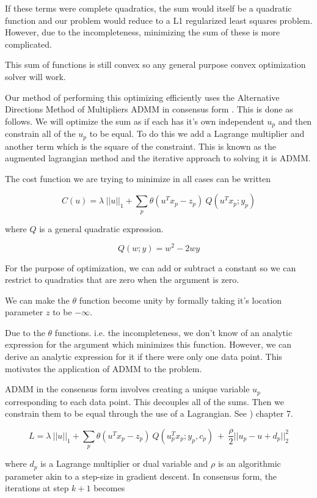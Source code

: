 \documentclass{article}
\begin{document}
If these terms were complete quadratics, the sum would itself be a quadratic
function and our problem would reduce to a L1 regularized least squares problem.
However, due to the incompleteness, minimizing the sum of these is more
complicated.

This sum of functions is still convex so any general purpose convex
optimization solver will work.

Our method of performing this optimizing efficiently uses the Alternative
Directions Method of Multipliers ADMM in consensus form \cite{boyd-admm}.
This is done as follows. We will optimize the sum as if each has it's own
independent $u_p$ and then constrain all of the $u_p$ to be equal. To do this
we add a Lagrange multiplier and another term which is the square of the
constraint. This is known as the augmented lagrangian method and the
iterative approach to solving it is ADMM.

The cost function we are trying to minimize in all cases can be written

\[
C(u) = \lambda ~ ||u||_1 + \sum_p \theta(u^T x_p - z_p) ~ Q(u^T x_p; y_p)
\]

where $Q$ is a general quadratic expression.

\[
Q(w; y) = w^2 - 2 w y
\]

For the purpose of optimization,
we can add or subtract a constant so we can restrict to quadratics that are zero
when the argument is zero.

We can make the $\theta$ function become unity by formally taking it's location parameter
$z$ to be $-\infty$.

Due to the $\theta$ functions. i.e. the incompleteness, we don't know of an analytic
expression for the argument which minimizes this function. However, we can derive an analytic
expression for it if there were only one data point. This motivates the application of ADMM
to the problem.

ADMM in the consensus form involves creating a unique variable $u_p$ corresponding to
each data point. This decouples all of the
sums. Then we constrain them to be equal through the use of a Lagrangian.
See \cite{boyd-admm}) chapter 7.

\[
L = \lambda ~ ||u||_1 + \sum_p \theta(u^T x_p - z_p) ~ Q(u_p^T x_p; y_p, c_p)
 ~ + ~ \frac{\rho}{2} ||u_p - u + d_p||_2^2
\]

where $d_p$ is a Lagrange multiplier or dual variable and $\rho$
is an algorithmic parameter akin to a step-size in gradient descent.
In consensus form, the iterations at step $k+1$ becomes
\end{document}
